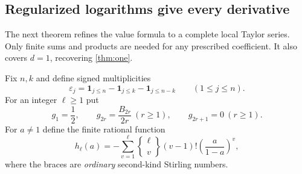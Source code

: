 \documentclass[11pt,a4paper]{article}
\numberwithin{equation}{section}
\theoremstyle{definition}
\theoremstyle{remark}
\newcommand{\stir}[2]{\genfrac{\{} {\}}{0pt}{}{#1}{#2}}
\begin{document}
\subsection{Regularized logarithms give every derivative}
The next theorem refines the value formula to a complete local Taylor series.
Only finite sums and products are needed for any prescribed coefficient.
It also covers $d=1$, recovering \cref{thm:one}.

Fix $n,k$ and define signed multiplicities
\begin{equation}\label{eq:epsilon-j}
 \varepsilon_j=\mathbf1_{j\le n}-\mathbf1_{j\le k}
                         -\mathbf1_{j\le n-k}\qquad(1\le j\le n).
\end{equation}
For an integer $\ell\ge1$ put
\begin{equation}\label{eq:gell}
 g_1=\frac12,\qquad g_{2r}=\frac{B_{2r}}{2r}\ (r\ge1),\qquad
 g_{2r+1}=0\ (r\ge1).
\end{equation}
For $a\ne1$ define the finite rational function
\begin{equation}\label{eq:hell}
 h_\ell(a)=-\sum_{v=1}^{\ell}\stir\ell v(v-1)!
                      \left(\frac{a}{1-a}\right)^v,
\end{equation}
where the braces are \emph{ordinary} second-kind Stirling numbers.
\end{document}
